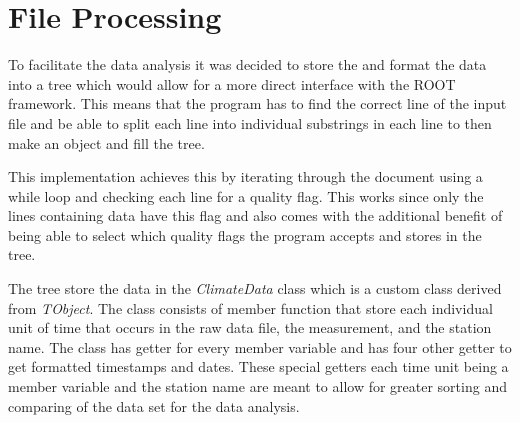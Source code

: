 \section{File Processing}

To facilitate the data analysis it was decided to store the and format the data into a tree which would allow for a more direct interface with the ROOT framework. This means that the program has to find the correct line of the input file and be able to split each line into individual substrings in each line to then make an object and fill the tree. 

\medskip 

This implementation achieves this by iterating through the document using a while loop and checking each line for a quality flag. This works since only the lines containing data have this flag and also comes with the additional benefit of being able to select which quality flags the program accepts and stores in the tree.

\medskip

The tree store the data in the \textit{ClimateData} class which is a custom class derived from \textit{TObject}. The class consists of member function that store each individual unit of time that occurs in the raw data file, the measurement, and the station name. The class has getter for every member variable and has four other getter to get formatted timestamps and dates. These special getters each time unit being a member variable and the station name are meant to allow for greater sorting and comparing of the data set for the data analysis. 

